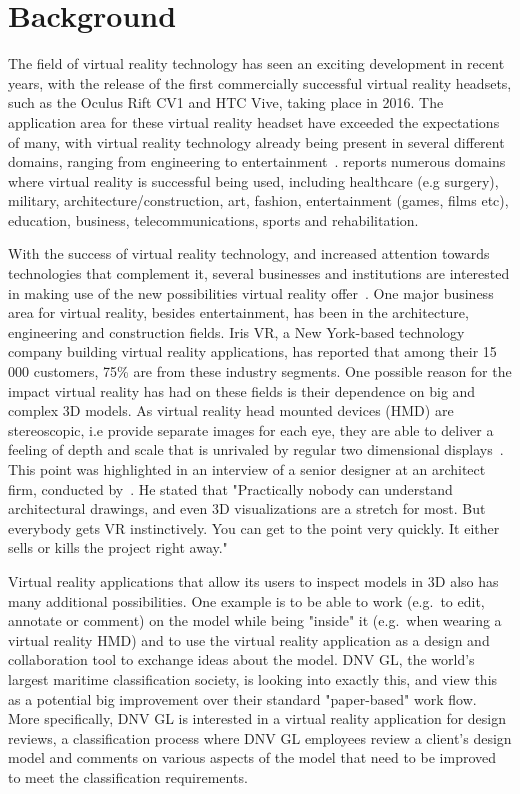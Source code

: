 \section{Background}           
The field of virtual reality technology has seen an exciting development in recent years, 
with the release of the first commercially successful virtual reality headsets, such as the Oculus Rift CV1 and HTC Vive, taking place in 2016.
The application area for these virtual reality headset have exceeded the expectations of many, with virtual reality 
technology already being present in several different domains, ranging from engineering to entertainment~\citep{VRS2016}. 
\citet{VRS2016} reports numerous domains where virtual reality is successful being used, including 
healthcare (e.g surgery), military, architecture/construction, art, fashion, entertainment (games, films etc), education, business, telecommunications, sports and rehabilitation.

With the success of virtual reality technology, and increased attention towards technologies that complement it, several businesses and institutions 
are interested in making use of the new possibilities virtual reality offer~\citep{TW22016}. One major business area for virtual reality, besides entertainment, 
has been in the architecture, engineering and construction fields. Iris VR, a New York-based technology company building virtual reality applications, has reported that
among their 15 000 customers, 75\% are from these industry segments. One possible reason for the impact virtual reality has had on these fields is their dependence 
on big and complex 3D models. As virtual reality head mounted devices (HMD) are stereoscopic, i.e provide separate images for each eye, they are able to deliver a feeling of 
depth and scale that is unrivaled by regular two dimensional displays~\citep{POLYGON2016}. This point was highlighted in an interview of a senior designer at an architect 
firm, conducted by~\citet{TW22016}. He stated that "Practically nobody can understand architectural drawings, and even 3D visualizations are a stretch for most. 
But everybody gets VR instinctively. You can get to the point very quickly. It either sells or kills the project right away." 

Virtual reality applications that allow its users to inspect models in 3D also has many additional possibilities. 
One example is to be able to work (e.g.~to edit, annotate or comment) on the model while being "inside" it (e.g.~when wearing a virtual reality HMD) and 
to use the virtual reality application as a design and collaboration tool to exchange ideas about the model.
DNV GL, the world's largest maritime classification society, is looking into exactly this, and view this as a potential big improvement over their standard 
"paper-based" work flow. More specifically, DNV GL is interested in a virtual reality application for design reviews, a classification process where DNV GL employees review 
a client's design model and comments on various aspects of the model that need to be improved to meet the classification requirements. 

